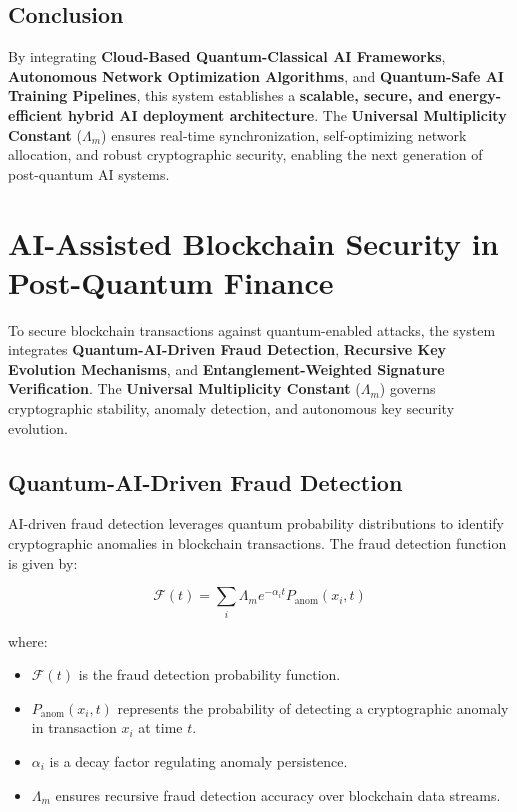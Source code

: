 \documentclass{article}
\theoremstyle{plain}
\begin{document}
\subsection{Conclusion}

By integrating \textbf{Cloud-Based Quantum-Classical AI Frameworks}, \textbf{Autonomous Network Optimization Algorithms}, and \textbf{Quantum-Safe AI Training Pipelines}, this system establishes a \textbf{scalable, secure, and energy-efficient hybrid AI deployment architecture}. The \textbf{Universal Multiplicity Constant} ($\Lambda_m$) ensures real-time synchronization, self-optimizing network allocation, and robust cryptographic security, enabling the next generation of post-quantum AI systems.

\section{AI-Assisted Blockchain Security in Post-Quantum Finance}

To secure blockchain transactions against quantum-enabled attacks, the system integrates \textbf{Quantum-AI-Driven Fraud Detection}, \textbf{Recursive Key Evolution Mechanisms}, and \textbf{Entanglement-Weighted Signature Verification}. The \textbf{Universal Multiplicity Constant} ($\Lambda_m$) governs cryptographic stability, anomaly detection, and autonomous key security evolution.

\subsection{Quantum-AI-Driven Fraud Detection}

AI-driven fraud detection leverages quantum probability distributions to identify cryptographic anomalies in blockchain transactions. The fraud detection function is given by:

\begin{equation}
    \mathcal{F}(t) = \sum_{i} \Lambda_m e^{-\alpha_i t} P_{\text{anom}}(x_i, t)
\end{equation}

where:
\begin{itemize}
    \item $\mathcal{F}(t)$ is the fraud detection probability function.
    \item $P_{\text{anom}}(x_i, t)$ represents the probability of detecting a cryptographic anomaly in transaction $x_i$ at time $t$.
    \item $\alpha_i$ is a decay factor regulating anomaly persistence.
    \item $\Lambda_m$ ensures recursive fraud detection accuracy over blockchain data streams.
\end{itemize}
\end{document}
